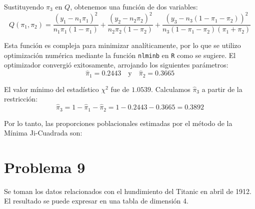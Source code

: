 Sustituyendo $\pi_3$ en $Q$, obtenemos una función de dos variables:
\begin{equation}
    Q(\pi_1, \pi_2) = \frac{(y_1 - n_1\pi_1)^2}{n_1\pi_1(1-\pi_1)} + \frac{(y_2 - n_2\pi_2)^2}{n_2\pi_2(1-\pi_2)} + \frac{(y_3 - n_3(1 - \pi_1 - \pi_2))^2}{n_3(1 - \pi_1 - \pi_2)(\pi_1 + \pi_2)}
\end{equation}

Esta función es compleja para minimizar analíticamente, por lo que se utilizo optimización numérica mediante la función \texttt{nlminb} en \texttt{R} como se sugiere. El optimizador convergió exitosamente, arrojando los siguientes parámetros:
\begin{equation}
    \hat{\pi}_1 = 0.2443 \quad \text{y} \quad \hat{\pi}_2 = 0.3665
\end{equation}

El valor mínimo del estadístico $\chi^2$ fue de $1.0539$.
Calculamos $\hat{\pi}_3$ a partir de la restricción:
\begin{equation}
    \hat{\pi}_3 = 1 - \hat{\pi}_1 - \hat{\pi}_2 = 1 - 0.2443 - 0.3665 = 0.3892
\end{equation}

Por lo tanto, las proporciones poblacionales estimadas por el método de la Mínima Ji-Cuadrada son:


\begin{center}
\end{center}

\newpage


\section*{Problema \textcolor{CIMATRed}{9}}

Se toman los datos relacionados con el hundimiento del Titanic en abril de 1912. El resultado se puede expresar en una tabla de dimensión 4.

